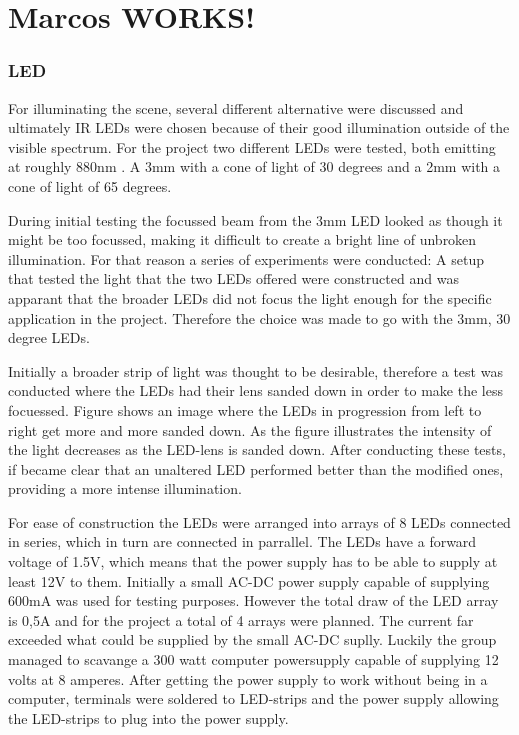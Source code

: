 \chapter{Marcos WORKS!}

\subsection{LED}
For illuminating the scene, several different alternative were discussed and ultimately IR LEDs were chosen  because of their good illumination outside of the visible spectrum. For the project two different LEDs were tested, both emitting at roughly 880nm . A 3mm with a cone of light of 30 degrees and a 2mm with a cone of light of 65 degrees. 

During initial testing the focussed beam from the 3mm LED looked as though it might be too focussed, making it  difficult to create a bright line of unbroken illumination. For that reason a series of experiments were conducted: A setup that tested the light that the two LEDs offered  were constructed and was apparant that the broader LEDs did not focus the light enough for the specific application in the project. Therefore the choice was made to go with the 3mm, 30 degree  LEDs.

Initially a broader strip of light was thought to be desirable, therefore a test was conducted where the LEDs had their lens sanded down in order to make the less focuessed. Figure  shows an image where the LEDs in progression from left to right get more and more sanded down. As the figure illustrates the intensity of the light decreases as the LED-lens is sanded down. After conducting these tests,  if became clear that an unaltered LED performed better than the modified ones, providing a more intense illumination.

For ease of construction the LEDs were arranged into arrays of 8 LEDs connected in series, which in turn are connected in parrallel. The LEDs have a forward voltage of 1.5V, which means that the power supply has to be able to supply at least 12V to them. Initially a small AC-DC power supply capable of supplying 600mA was used for testing purposes. However the total draw of the LED array is 0,5A and for the project a total of 4 arrays were planned. The current far exceeded what could be supplied by the small AC-DC suplly. Luckily the group managed to scavange a 300 watt computer powersupply capable of supplying 12 volts at 8 amperes. After getting the power supply to work without being in a computer, terminals were soldered to LED-strips and the power supply allowing the LED-strips to plug into the power supply.


